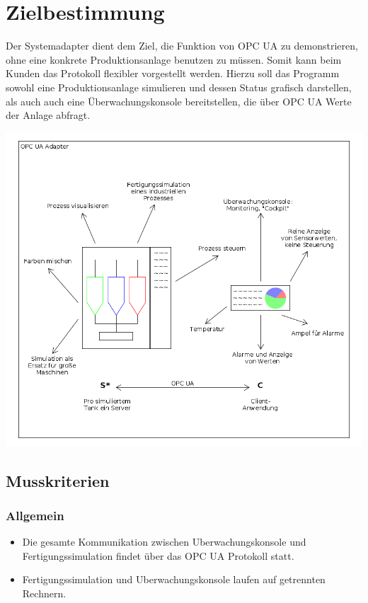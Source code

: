 \documentclass[parskip=full]{scrartcl}
\begin{document}
\section{Zielbestimmung}
Der \gls{Systemadapter} dient dem Ziel, die Funktion von \gls{OPC UA} zu demonstrieren, ohne eine konkrete \gls{Produktionsanlage}
benutzen zu müssen. Somit kann beim Kunden das Protokoll flexibler vorgestellt werden. Hierzu soll das Programm
sowohl eine \gls{Produktionsanlage} simulieren und dessen Status grafisch darstellen, als auch auch eine Überwachungskonsole
bereitstellen, die über OPC UA Werte der Anlage abfragt.\\
\begin{center}
    \includegraphics[scale=0.5]{../system-sketch.png}
\end{center}

\subsection{Musskriterien}
\subsubsection{Allgemein}
\begin{itemize}
  \item Die gesamte Kommunikation zwischen \gls{Uberwachungskonsole} und \gls{Fertigungssimulation} findet \"uber das \gls{OPC UA} Protokoll statt.
  \item \gls{Fertigungssimulation} und \gls{Uberwachungskonsole} laufen auf getrennten Rechnern.
\end{itemize}
\end{document}
